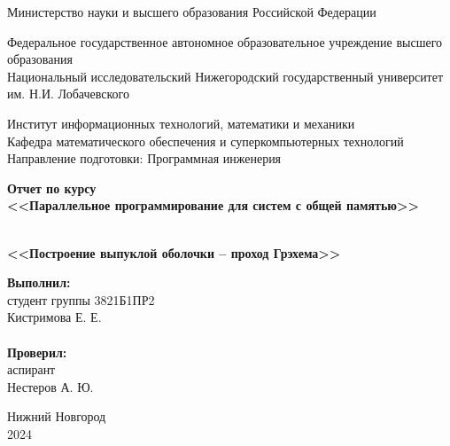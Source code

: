 \documentclass{report}
\begin{document}
\begin{titlepage}

\begin{center}
Министерство науки и высшего образования Российской Федерации
\end{center}

\begin{center}
Федеральное государственное автономное образовательное учреждение высшего образования \\
Национальный исследовательский Нижегородский государственный университет \newline им. Н.И. Лобачевского
\end{center}

\begin{center}
Институт информационных технологий, математики и механики \\
Кафедра математического обеспечения и суперкомпьютерных технологий \\
Направление подготовки: Программная инженерия
\end{center}

\begin{center}
\textbf{Отчет по курсу \\
\vspace{0.5em}
<<Параллельное программирование для систем с общей памятью>>} \\
\end{center}

\vspace{4em}

\begin{center}
\textbf{ \\
\vspace{0.5em}
<<Построение выпуклой оболочки – проход Грэхема>>} \\
\end{center}

\vspace{4em}

\newbox{\lbox}
\newlength{\maxl}
\setlength{\maxl}{\wd\lbox}
\hfill\parbox{7cm}{
\hspace*{5cm}\hspace*{-5cm}\textbf{Выполнил:} \\ студент группы 3821Б1ПР2\\Кистримова Е. Е.\\
\\
\hspace*{5cm}\hspace*{-5cm}\textbf{Проверил:}\\ аспирант\\Нестеров А. Ю.\\
}
\vspace{\fill}

\begin{center} Нижний Новгород \\ 2024 \end{center}

\end{titlepage}
\end{document}
